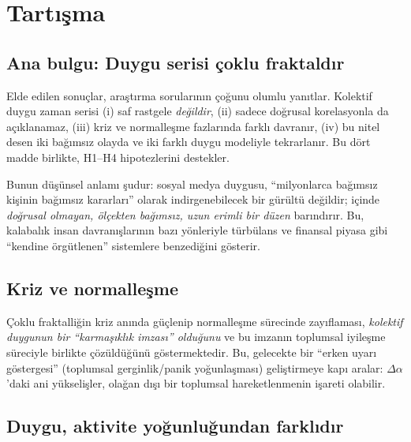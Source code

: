 \documentclass[11pt,a4paper]{article}
\newcommand{\Dal}{\Delta\alpha}
\begin{document}
\section{Tartışma}

\subsection{Ana bulgu: Duygu serisi çoklu fraktaldır}

Elde edilen sonuçlar, araştırma sorularının çoğunu olumlu yanıtlar. Kolektif
duygu zaman serisi (i) saf rastgele \emph{değildir}, (ii) sadece doğrusal
korelasyonla da açıklanamaz, (iii) kriz ve normalleşme fazlarında farklı
davranır, (iv) bu nitel desen iki bağımsız olayda ve iki farklı duygu
modeliyle tekrarlanır. Bu dört madde birlikte, H1--H4 hipotezlerini
destekler.

Bunun düşünsel anlamı şudur: sosyal medya duygusu, ``milyonlarca bağımsız
kişinin bağımsız kararları'' olarak indirgenebilecek bir gürültü değildir;
içinde \emph{doğrusal olmayan, ölçekten bağımsız, uzun erimli bir düzen}
barındırır. Bu, kalabalık insan davranışlarının bazı yönleriyle türbülans ve
finansal piyasa gibi ``kendine örgütlenen'' sistemlere benzediğini gösterir.

\subsection{Kriz ve normalleşme}

Çoklu fraktalliğin kriz anında güçlenip normalleşme sürecinde zayıflaması,
\emph{kolektif duygunun bir ``karmaşıklık imzası'' olduğunu} ve bu imzanın
toplumsal iyileşme süreciyle birlikte çözüldüğünü göstermektedir. Bu,
gelecekte bir ``erken uyarı göstergesi'' (toplumsal gerginlik/panik
yoğunlaşması) geliştirmeye kapı aralar: $\Dal$'daki ani yükselişler, olağan
dışı bir toplumsal hareketlenmenin işareti olabilir.

\subsection{Duygu, aktivite yoğunluğundan farklıdır}
\end{document}
